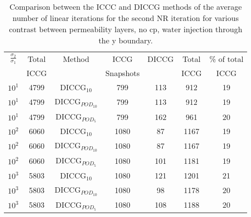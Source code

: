 \documentclass[a4paper,10pt]{report}
\begin{document}
\begin{table}[!ht]\centering
\begin{minipage}{1\textwidth}
 \centering
\begin{tabular}{ ||c|c||c|c|c|c|c||} 
\hline
$\frac{\sigma_2}{\sigma_1}$&Total&Method  & ICCG&DICCG &Total&\% of total\\ 
                           & ICCG     &  & Snapshots& &ICCG& ICCG\\ 
\hline 
$10^{1}$ &4799& DICCG$_{10}$&799&113&912&19\\ 
\hline  
$10^{1}$ &4799& DICCG$_{POD_{10}}$&799&113&912&19 \\ 
\hline  
$10^{1}$ &4799& DICCG$_{POD_{5}}$&799&162&961&20 \\ 
\hline  
$10^{2}$ &6060& DICCG$_{10}$&1080&87&1167&19\\ 
\hline  
$10^{2}$ &6060& DICCG$_{POD_{10}}$&1080&87&1167&19 \\ 
\hline  
$10^{2}$ &6060& DICCG$_{POD_{5}}$&1080&101&1181&19 \\ 
\hline 
$10^{3}$ &5803& DICCG$_{10}$&1080&121&1201&21\\ 
\hline  
$10^{3}$ &5803& DICCG$_{POD_{10}}$&1080&98&1178&20 \\ 
\hline  
$10^{3}$ &5803& DICCG$_{POD_{5}}$&1080&108&1188&20 \\ 
\hline 
\end{tabular} 
\caption{Comparison between the ICCC and DICCG methods of the average number of linear iterations for the second NR iteration for various contrast between permeability layers, no cp, water injection through the y boundary. }\label{table:litertot2} 
\end{minipage}  
\end{table}  
\end{document}
